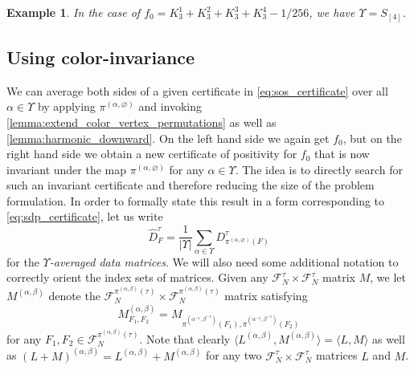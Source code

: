 \documentclass[a4paper,11pt]{article}
\newtheorem{example}[theorem]{Example}
\numberwithin{equation}{section}
\newcommand{\mF}{\mathcal{F}}
\begin{document}
%
% 
\begin{example}
    In the case of $f_0 = K_3^1 + K_3^2 + K_3^3 + K_3^4 - 1/256$, we have $\Upsilon = S_{[4]}$.
\end{example}






\subsection{Using color-invariance}\label{sec:color_invariance}


We can average both sides of a given certificate in \cref{eq:sos_certificate}  over all $\alpha \in \Upsilon$ by applying $\pi^{(\alpha,\varnothing)}$ and invoking \cref{lemma:extend_color_vertex_permutations} as well as \cref{lemma:harmonic_downward}. On the left hand side we again get $f_0$, but on the right hand side we obtain a new certificate of positivity for $f_0$ that is now invariant under the map $\pi^{(\alpha,\varnothing)}$ for any $\alpha \in \Upsilon$. The idea is to directly search for such an invariant certificate and therefore reducing the size of the problem formulation.
%
 In order to formally state this result in a form corresponding to  \cref{eq:sdp_certificate}, let us write 
%
\begin{equation*}
    \hat{D}_{F }^{\tau } = \frac{1}{|\Upsilon|}\sum_{\alpha \in \Upsilon} D^\tau_{\pi^{(\alpha,\varnothing)} (F)}
\end{equation*}
%
for the \emph{$\Upsilon$-averaged data matrices}. We will also need some additional notation to correctly orient the index sets of matrices.
Given any $\mF^\tau_N \times \mF^\tau_N$ matrix $M$, we let $M^{(\alpha, \beta)}$ denote the $\mF^{\pi^{(\alpha,\beta)}(\tau)}_N \times \mF^{\pi^{(\alpha,\beta)}(\tau)}_N$ matrix satisfying
%
\begin{equation*}
    M^{(\alpha, \beta)}_{F_1, F_2} = M_{\pi^{(\alpha^{-1},\beta^{-1})}(F_1),\pi^{(\alpha^{-1},\beta^{-1})}(F_2)}
\end{equation*}
%
for any $F_1, F_2 \in \mF^{\pi^{(\alpha,\beta)}(\tau)}_N$. Note that clearly  $\langle L^{(\alpha,\beta)}, M^{(\alpha,\beta)}\rangle = \langle L, M\rangle$ as well as $(L + M)^{(\alpha,\beta)} = L^{(\alpha,\beta)} + M^{(\alpha,\beta)}$ for any two $\mF^\tau_N \times \mF^\tau_N$ matrices $L$ and $M$.
\end{document}
